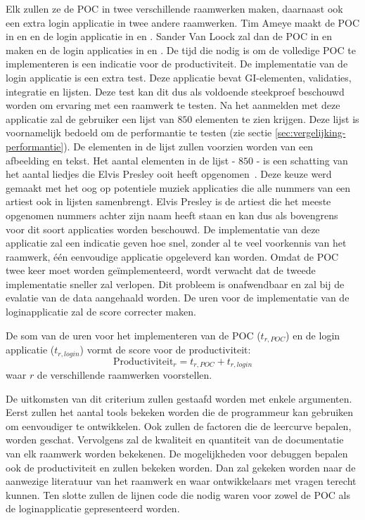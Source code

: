 Elk zullen ze de POC in twee verschillende raamwerken maken,  daarnaast ook een extra login applicatie in twee andere raamwerken.
Tim Ameye maakt de POC in \jqm{} en \lungo{} en de login applicatie in \st{} en \kendo{}.
Sander Van Loock zal dan de POC in \st{} en \kendo{} maken en de login applicaties in \jqm{} en \lungo{}.
De tijd die nodig is om de volledige POC te implementeren is een indicatie voor de productiviteit. 
De implementatie van de login applicatie is een extra test.
Deze applicatie bevat GI-elementen, validaties,   integratie en lijsten.
Deze test kan dit dus als voldoende steekproef beschouwd worden om ervaring met een raamwerk te testen.
Na het aanmelden met deze applicatie zal de gebruiker een lijst van $850$ elementen te zien krijgen.
Deze lijst is voornamelijk bedoeld om de performantie te testen (zie sectie \ref{sec:vergelijking-performantie}).
De elementen in de lijst zullen voorzien worden van een afbeelding en tekst.
Het aantal elementen in de lijst - $850$ - is een schatting van het aantal liedjes die Elvis Presley ooit heeft opgenomen~\cite{Zimmy2011}.
Deze keuze werd gemaakt met het oog op potentiele muziek applicaties die alle nummers van een artiest ook in lijsten samenbrengt.
Elvis Presley is de artiest die het meeste opgenomen nummers achter zijn naam heeft staan en kan dus als bovengrens voor dit soort applicaties worden beschouwd.
De implementatie van deze applicatie zal een indicatie geven hoe snel,  zonder al te veel voorkennis van het raamwerk,  één eenvoudige applicatie opgeleverd kan worden.
Omdat de POC twee keer moet worden geïmplementeerd, wordt verwacht dat de tweede implementatie sneller zal verlopen.
Dit probleem is onafwendbaar en zal bij de evalatie van de data aangehaald worden.
De uren voor de implementatie van de loginapplicatie zal de score correcter maken.

De som van de uren voor het implementeren van de POC ($t_{r,POC}$) en de login applicatie ($t_{r,login}$) vormt de score voor de productiviteit:
\begin{equation}
  \text{Productiviteit}_r = {t_{r,POC} + t_{r,login}}
  \label{eq:productiviteit}
\end{equation}
waar $r$ de verschillende raamwerken voorstellen.

De uitkomsten van dit criterium zullen gestaafd worden met enkele argumenten.
Eerst zullen het aantal tools bekeken worden die de programmeur kan gebruiken om eenvoudiger te ontwikkelen.
Ook zullen de factoren die de leercurve bepalen, worden geschat.
Vervolgens zal de kwaliteit en quantiteit van de documentatie van elk raamwerk worden bekekenen.
De mogelijkheden voor debuggen bepalen ook de productiviteit en zullen bekeken worden.
Dan zal gekeken worden naar de aanwezige literatuur van het raamwerk en waar ontwikkelaars met vragen terecht kunnen.
Ten slotte zullen de lijnen code die nodig waren voor zowel de POC als de loginapplicatie gepresenteerd worden.

